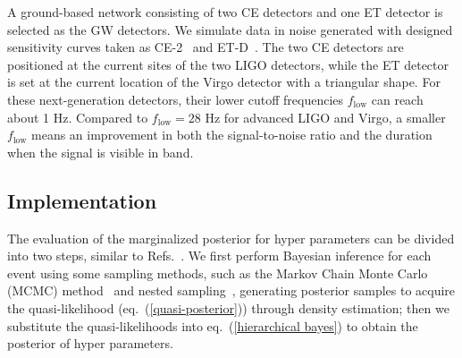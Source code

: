 \documentclass[a4paper,11pt]{article}
\begin{document}
A ground-based network consisting of two CE detectors and one ET detector is selected as the GW detectors. 
We simulate data in noise generated with designed sensitivity curves taken as CE-2~\cite{Reitze:2019iox, Reitze:2019dyk} and ET-D~\cite{Punturo:2010zz, Hild:2010id, Sathyaprakash:2012jk}. 
The two CE detectors are positioned at the current sites of the two LIGO detectors, while the ET detector is set at the current location of the 
Virgo detector with a triangular shape. For these next-generation detectors, their lower cutoff frequencies $f_{\text{low}}$ can reach about 1 Hz. 
Compared to $f_{\text{low}}=28$ Hz for advanced LIGO and Virgo, a smaller $f_{\text{low}}$ means an improvement in both the signal-to-noise ratio and the duration 
when the signal is visible in band.

\subsection{Implementation}
\label{sec3_2}

The evaluation of the marginalized posterior for hyper parameters can be divided into two steps, similar to 
Refs.~\cite{Steiner:2010fz, Lackey:2014fwa, Wang:2024xon}. We first perform Bayesian inference for each event using some sampling methods, 
such as the Markov Chain Monte Carlo (MCMC) method~\cite{Christensen:1998gf, Christensen:2004jm} and nested sampling~\cite{Skilling:2004pqw, Skilling:2006gxv}, 
generating posterior samples to acquire the quasi-likelihood (eq.~(\ref{quasi-posterior})) through density estimation; 
then we substitute the quasi-likelihoods into eq.~(\ref{hierarchical bayes}) to obtain the posterior of hyper parameters. 
\end{document}
